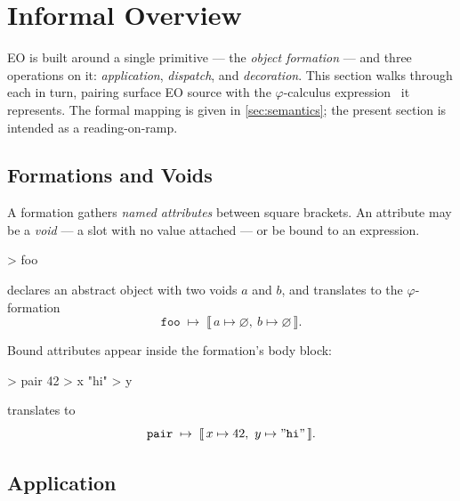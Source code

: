 
\section{Informal Overview}\label{sec:overview}

EO is built around a single primitive --- the \emph{object formation} ---
  and three operations on it: \emph{application}, \emph{dispatch}, and
  \emph{decoration}.
This section walks through each in turn,
  pairing surface EO source with the \(\varphi\)-calculus
  expression~\citep{bugayenko2021eolang} it represents.
The formal mapping is given in \cref{sec:semantics};
  the present section is intended as a reading-on-ramp.

\subsection{Formations and Voids}\label{sec:over:formation}

A formation gathers \emph{named attributes} between square brackets.
An attribute may be a \emph{void} --- a slot with no value attached ---
  or be bound to an expression.

\begin{ffcode}
[a b] > foo
\end{ffcode}

declares an abstract object  with two voids \(a\) and \(b\),
  and translates to the \(\varphi\)-formation
\begin{equation*}
  \mathtt{foo}\;\mapsto\;
    \llbracket\,
      a \mapsto \varnothing,\ b \mapsto \varnothing
    \,\rrbracket.
\end{equation*}

Bound attributes appear inside the formation's body block:

\begin{ffcode}
[] > pair
  42 > x
  "hi" > y
\end{ffcode}

translates to
\begin{equation*}
  \mathtt{pair}\;\mapsto\;
    \llbracket\,
      x \mapsto 42,\ y \mapsto \mathtt{"hi"}
    \,\rrbracket.
\end{equation*}

\subsection{Application}\label{sec:over:application}

